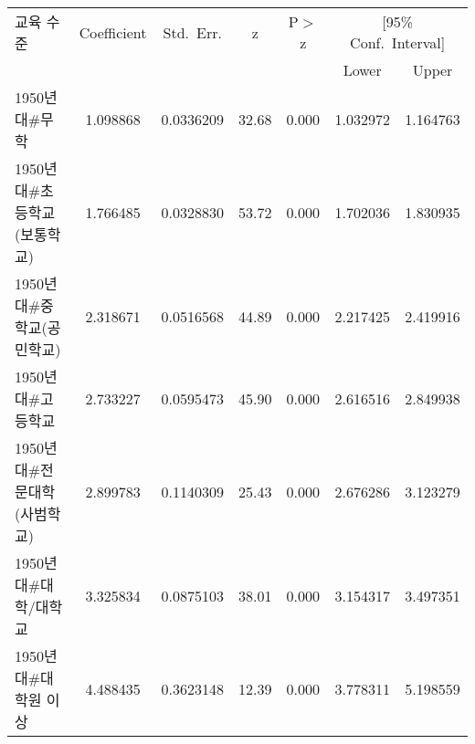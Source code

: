 \begin{tabular}{lcccccc}
\toprule
교육 수준 & Coefficient & Std.~Err. & z & P$>$z & \multicolumn{2}{c}{[95\% Conf.~Interval]} \\
\cmidrule(lr){6-7}
 &  &  &  &  & Lower & Upper \\
\midrule
1950년대\#무학 & 1.098868 & 0.0336209 & 32.68 & 0.000 & 1.032972 & 1.164763 \\
1950년대\#초등학교(보통학교) & 1.766485 & 0.0328830 & 53.72 & 0.000 & 1.702036 & 1.830935 \\
1950년대\#중학교(공민학교) & 2.318671 & 0.0516568 & 44.89 & 0.000 & 2.217425 & 2.419916 \\
1950년대\#고등학교 & 2.733227 & 0.0595473 & 45.90 & 0.000 & 2.616516 & 2.849938 \\
1950년대\#전문대학(사범학교) & 2.899783 & 0.1140309 & 25.43 & 0.000 & 2.676286 & 3.123279 \\
1950년대\#대학/대학교 & 3.325834 & 0.0875103 & 38.01 & 0.000 & 3.154317 & 3.497351 \\
1950년대\#대학원 이상 & 4.488435 & 0.3623148 & 12.39 & 0.000 & 3.778311 & 5.198559 \\
\bottomrule
\end{tabular}
